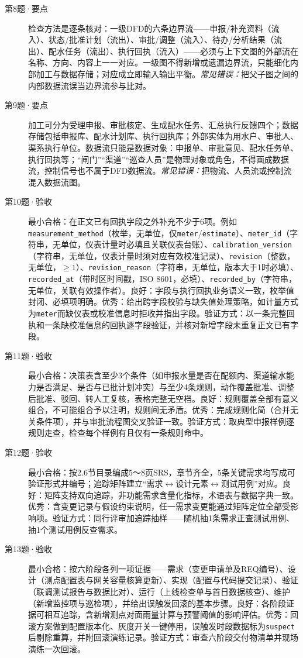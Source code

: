 \begin{description}
\item[第8题·要点] 检查方法是逐条核对：一级DFD的六条边界流——申报/补充资料（流入）、状态/批准计划（流出）、审批/调整（流入）、待办/分析结果（流出）、配水任务（流出）、执行回执（流入）——必须与上下文图的外部流在名称、方向、内容上一一对应。一级图不得新增或遗漏边界流，只能细化内部加工与数据存储；对应成立即输入输出平衡。\textit{常见错误：}把父子图之间的内部数据流误当边界流参与比对。
\item[第9题·要点] 加工可分为受理申报、审批核定、生成配水任务、汇总执行反馈四个；数据存储包括申报库、配水计划库、执行回执库；外部实体为用水户、审批人、渠系执行单位。数据流只能是数据对象：申报单、审批意见、配水任务单、执行回执等；“闸门”“渠道”“巡查人员”是物理对象或角色，不得画成数据流，控制信号也不属于DFD数据流。\textit{常见错误：}把物流、人员流或控制流混入数据流图。
\item[第10题·验收] 最小合格：在正文已有回执字段之外补充不少于6项。例如\texttt{measurement\_method}（枚举，无单位，仅\texttt{meter}/\texttt{estimate}）、\texttt{meter\_id}（字符串，无单位，仪表计量时必填且关联仪表台账）、\texttt{calibration\_version}（字符串，无单位，仪表计量时须对应有效校准记录）、\texttt{revision}（整数，无单位，$\geq1$）、\texttt{revision\_reason}（字符串，无单位，版本大于1时必填）、\texttt{recorded\_at}（带时区时间戳，ISO 8601，必填）、\texttt{recorded\_by}（字符串，无单位，关联有效操作者）。良好：字段与执行回执业务语义一致，枚举值封闭、必填项明确。优秀：给出跨字段校验与缺失值处理策略，如计量方式为\texttt{meter}而缺仪表或校准信息时拒收并指出字段。验证方式：以一条完整回执和一条缺校准信息的回执逐字段验证，并核对新增字段未重复正文已有字段。
\item[第11题·验收] 最小合格：决策表含至少3个条件（如申报水量是否在配额内、渠道输水能力是否满足、是否与已批计划冲突）与至少4条规则，动作覆盖批准、调整后批准、驳回、转人工复核，表格完整无空档。良好：规则覆盖全部有意义组合，不可能组合予以注明，规则间无矛盾。优秀：完成规则化简（合并无关条件项），并与审批流程图交叉验证一致。验证方式：取典型申报样例逐规则走查，检查每个样例有且仅有一条规则命中。
\item[第12题·验收] 最小合格：按2.6节目录编成5～8页SRS，章节齐全，5条关键需求均写成可验证形式并编号；追踪矩阵建立“需求$\leftrightarrow$设计元素$\leftrightarrow$测试用例”对应。良好：矩阵支持双向追踪，非功能需求含量化指标，术语表与数据字典一致。优秀：含变更记录与假设约束说明，任一需求变更能通过矩阵定位全部受影响项。验证方式：同行评审加追踪抽样——随机抽1条需求正查测试用例、抽1个测试用例反查需求。
\item[第13题·验收] 最小合格：按六阶段各列一项证据——需求（变更申请单及REQ编号）、设计（测点配置表与网关容量核算更新）、实现（配置与代码提交记录）、验证（联调测试报告与数据比对）、运行（上线检查单与首日数据核查）、维护（新增监控项与巡检项），并给出误触发回滚的基本步骤。良好：各阶段证据可相互追踪，含新增测点对面雨量计算与预警阈值的影响评估。优秀：回滚方案做到配置版本化、灰度开关一键停用，误触发时段数据标为\texttt{suspect}后剔除重算，并附回滚演练记录。验证方式：审查六阶段交付物清单并现场演练一次回滚。

\end{description}
